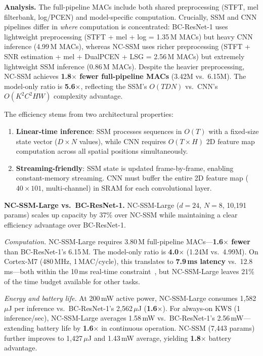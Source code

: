 \documentclass[journal]{IEEEtran}
\begin{document}
\smallskip\noindent\textbf{Analysis.}
The full-pipeline MACs include both shared preprocessing (STFT, mel filterbank, log/PCEN) and model-specific computation.
Crucially, SSM and CNN pipelines differ in \emph{where} computation is concentrated:
BC-ResNet-1 uses lightweight preprocessing (STFT + mel + log = 1.35\,M MACs) but heavy CNN inference (4.99\,M MACs),
whereas NC-SSM uses richer preprocessing (STFT + SNR estimation + mel + DualPCEN + LSG = 2.56\,M MACs) but extremely lightweight SSM inference (0.86\,M MACs).
Despite the heavier preprocessing, NC-SSM achieves \textbf{1.8$\times$ fewer full-pipeline MACs} (3.42M vs.\ 6.15M).
The model-only ratio is \textbf{5.6$\times$}, reflecting the SSM's $O(TDN)$ vs.\ CNN's $O(K^2C^2HW)$ complexity advantage.

The efficiency stems from two architectural properties:
\begin{enumerate}
\setlength\itemsep{0pt}
\item \textbf{Linear-time inference}: SSM processes sequences in $O(T)$ with a fixed-size state vector ($D \times N$ values), while CNN requires $O(T \times H)$ 2D feature map computation across all spatial positions simultaneously.
\item \textbf{Streaming-friendly}: SSM state is updated frame-by-frame, enabling constant-memory streaming. CNN must buffer the entire 2D feature map ($40 \times 101$, multi-channel) in SRAM for each convolutional layer.
\end{enumerate}

\smallskip\noindent\textbf{NC-SSM-Large vs.\ BC-ResNet-1.}
NC-SSM-Large ($d{=}24$, $N{=}8$, 10{,}191 params) scales up capacity by 37\% over NC-SSM while maintaining a clear efficiency advantage over BC-ResNet-1.

\emph{Computation.}
NC-SSM-Large requires 3.80\,M full-pipeline MACs---\textbf{1.6$\times$ fewer} than BC-ResNet-1's 6.15\,M.
The model-only ratio is \textbf{4.0$\times$} (1.24M vs.\ 4.99M).
On Cortex-M7 (480\,MHz, 1\,MAC/cycle), this translates to \textbf{7.9\,ms latency} vs.\ 12.8\,ms---both within the 10\,ms real-time constraint~\cite{banbury2021mlperf}, but NC-SSM-Large leaves 21\% of the time budget available for other tasks.

\emph{Energy and battery life.}
At 200\,mW active power, NC-SSM-Large consumes 1{,}582\,$\mu$J per inference vs.\ BC-ResNet-1's 2{,}562\,$\mu$J (\textbf{1.6$\times$}).
For always-on KWS (1\,inference/sec), NC-SSM-Large averages 1.58\,mW vs.\ BC-ResNet-1's 2.56\,mW---extending battery life by \textbf{1.6$\times$} in continuous operation.
NC-SSM (7{,}443 params) further improves to 1{,}427\,$\mu$J and 1.43\,mW average, yielding \textbf{1.8$\times$} battery advantage.
\end{document}
